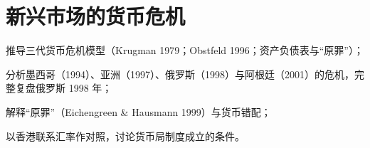 \chapter{新兴市场的货币危机}\label{ch:emcrises}

\begin{chapterguide}
\begin{guidegoals}
\item 推导三代货币危机模型（Krugman 1979；Obstfeld 1996；资产负债表与“原罪”）；
\item 分析墨西哥（1994）、亚洲（1997）、俄罗斯（1998）与阿根廷（2001）的危机，完整复盘俄罗斯 1998 年；
\item 解释“原罪”（Eichengreen \& Hausmann 1999）与货币错配；
\item 以香港联系汇率作对照，讨论货币局制度成立的条件。
\end{guidegoals}
\end{chapterguide}

\chapterstub
